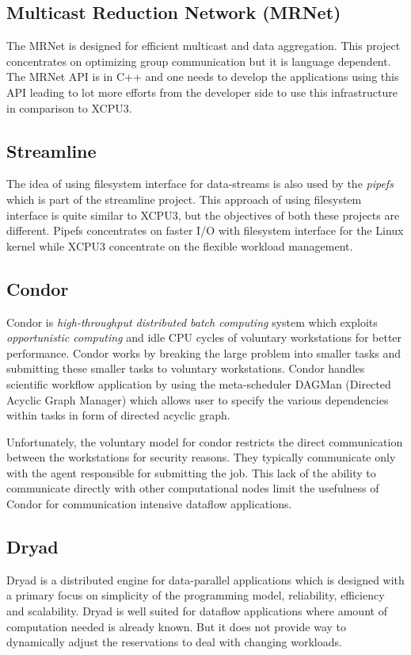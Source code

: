\documentclass{sig-alternate}
\begin{document}
\subsection{Multicast Reduction Network (MRNet)}
The MRNet\cite{MRNet} is designed for efficient multicast and data aggregation.
This project concentrates on optimizing group communication but it is language
dependent.  The MRNet API is in C++ and one needs to develop the applications
using this API leading to lot more efforts from the developer side to use this
infrastructure in comparison to XCPU3.

\subsection{Streamline}
The idea of using filesystem interface for data-streams is also used by the
\textit{pipefs}\cite{1400104} which is part of the streamline\cite{streamline}
project.  This approach of using filesystem interface is quite similar to
XCPU3, but the objectives of both these projects are different. Pipefs
concentrates on faster I/O with filesystem interface for the Linux kernel
while XCPU3 concentrate on the flexible workload management.

\subsection{Condor}
Condor\cite{condor-practice} is \textit{high-throughput distributed batch
computing} system which exploits \textit{opportunistic computing} and idle CPU
cycles of voluntary workstations for better performance.  Condor works by
breaking the large problem into smaller tasks and submitting these smaller
tasks to voluntary workstations. Condor handles scientific workflow
application by using the meta-scheduler DAGMan (Directed Acyclic Graph Manager)
which allows user to specify the various dependencies within tasks in form of
directed acyclic graph. 

Unfortunately, the voluntary model for condor restricts the direct communication
between the workstations for security reasons.  They typically communicate
only with the agent responsible for submitting the job.  This lack of the
ability to communicate directly with other computational nodes limit the
usefulness of Condor for communication intensive dataflow applications.


\subsection{Dryad}
Dryad\cite{yu2008dsg} is a distributed engine for data-parallel applications
which is designed with a primary focus on simplicity of the programming model,
reliability, efficiency and scalability.  Dryad is well suited for dataflow
applications where amount of computation needed is already known.  But it does
not provide way to dynamically adjust the reservations to deal with changing
workloads.    
\end{document}
